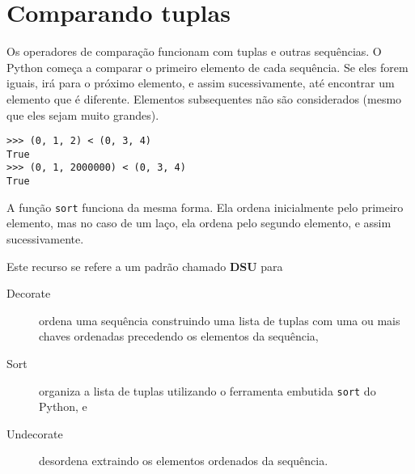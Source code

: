 \section{Comparando tuplas}


Os operadores de comparação funcionam com tuplas e outras sequências. O
Python começa a comparar o primeiro elemento de cada sequência. Se eles forem
iguais, irá para o próximo elemento, e assim sucessivamente, até encontrar um
elemento que é diferente. Elementos subsequentes não são considerados (mesmo
que eles sejam muito grandes).

\beforeverb
\begin{verbatim}
>>> (0, 1, 2) < (0, 3, 4)
True
>>> (0, 1, 2000000) < (0, 3, 4)
True
\end{verbatim}
\afterverb
%
A função {\tt sort} funciona da mesma forma. Ela ordena inicialmente pelo
primeiro elemento, mas no caso de um laço, ela ordena pelo segundo elemento,
e assim sucessivamente.

Este recurso se refere a um padrão chamado {\bf DSU} para

\begin{description}

\item[Decorate] ordena uma sequência construindo uma lista de tuplas com uma
ou mais chaves ordenadas precedendo os elementos da sequência,

\item[Sort] organiza a lista de tuplas utilizando o ferramenta embutida
{\tt sort} do Python, e

\item[Undecorate] desordena extraindo os elementos ordenados da sequência.

\end{description}

